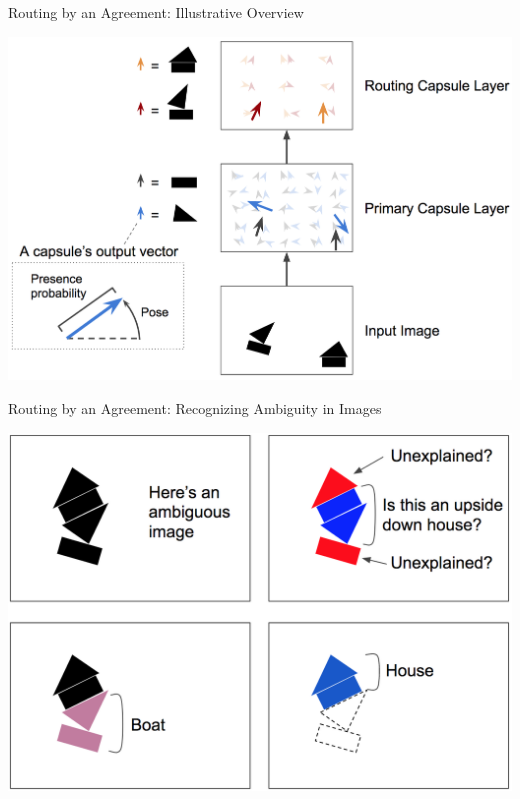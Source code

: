 \documentclass{beamer}
\begin{document}
{    \begin{frame}{Routing by an Agreement: Illustrative Overview}
      \pause
      \begin{center}
        \includegraphics[height=.85\textheight]{../img/routing-by-layers.png}
      \end{center}
    \end{frame}

    \begin{frame}{Routing by an Agreement: Recognizing Ambiguity in Images}
      \begin{center}
        \includegraphics[height=.85\textheight]{../img/ambiguous-shapes.png}
      \end{center}
    \end{frame}
  }
\end{document}
